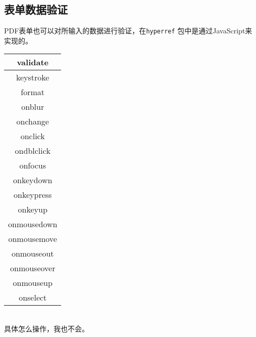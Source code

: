 \subsection{表单数据验证}
PDF表单也可以对所输入的数据进行验证，在\texttt{hyperref} 包中是通过JavaScript来实现的。

\begin{tabular}{|c|}
	\hline
	validate\\ \hline
	keystroke\\ \hline
	format\\ \hline
	onblur\\ \hline
	onchange\\ \hline
	onclick\\ \hline
	ondblclick\\ \hline
	onfocus\\ \hline
	onkeydown\\ \hline
	onkeypress\\ \hline
	onkeyup\\ \hline
	onmousedown\\ \hline
	onmousemove\\ \hline
	onmouseout\\ \hline
	onmouseover\\ \hline
	onmouseup\\ \hline
	onselect\\ \hline	
\end{tabular}\\


具体怎么操作，我也不会。